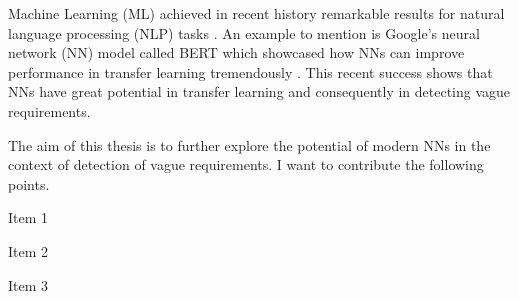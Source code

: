 Machine Learning (ML) achieved in recent history remarkable results for natural language processing (NLP) tasks \citep{Khan:2016}.
An example to mention is Google's neural network (NN) model called BERT which showcased how NNs can improve performance in transfer learning tremendously \citep{Devlin:2018}.
This recent success shows that NNs have great potential in transfer learning and consequently in detecting vague requirements.

The aim of this thesis is to further explore the potential of modern NNs in the context of detection of vague requirements.
I want to contribute the following points.
\begin{compactenum}
	\item Item 1
	\item Item 2
	\item Item 3
\end{compactenum}
